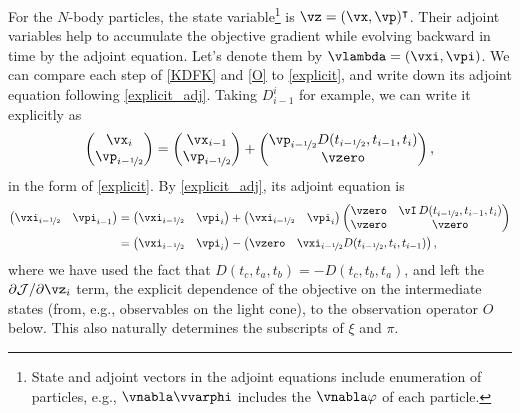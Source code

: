 \documentclass[modern, dvipsnames]{aastex631}
\newcommand{\p}{\partial}
\newcommand{\cJ}{\mathcal{J}}
\newcommand{\half}{\nicefrac12}
\begin{document}
For the $N$-body particles, the state variable\footnote{State and
adjoint vectors in the adjoint equations include enumeration of
particles, e.g., $\vnabla\vvarphi$ includes the $\vnabla\varphi$ of each
particle.} is $\vz = (\vx, \vp)^\intercal$.
Their adjoint variables help to accumulate the objective gradient while
evolving backward in time by the adjoint equation.
Let's denote them by $\vlambda = (\vxi, \vpi)$.
We can compare each step of \eqref{KDFK} and \eqref{O} to
\eqref{explicit}, and write down its adjoint equation following
\eqref{explicit_adj}.
Taking $D_{i-1}^i$ for example, we can write it explicitly as
%
\begin{equation*}
\begin{pmatrix} \vx_i \\ \vp_{i-\half} \end{pmatrix}
= \begin{pmatrix} \vx_{i-1} \\ \vp_{i-\half} \end{pmatrix}
+ \begin{pmatrix}
    \vp_{i-\half} D(t_{i-\half}, t_{i-1}, t_i) \\ \vzero
  \end{pmatrix},
\end{equation*}
%
in the form of \eqref{explicit}.
By \eqref{explicit_adj}, its adjoint equation is
%
\begin{align*}
\begin{pmatrix} \vxi_{i-\half} & \vpi_{i-1} \end{pmatrix}
&= \begin{pmatrix} \vxi_{i-\half} & \vpi_i \end{pmatrix}
+ \begin{pmatrix} \vxi_{i-\half} & \vpi_i \end{pmatrix}
  \begin{pmatrix}
    \vzero & \vI \, D(t_{i-\half}, t_{i-1}, t_i) \\
    \vzero & \vzero \\
  \end{pmatrix} \\
%
&= \begin{pmatrix} \vxi_{i-\half} & \vpi_i \end{pmatrix}
- \begin{pmatrix}
    \vzero & \vxi_{i-\half} D(t_{i-\half}, t_i, t_{i-1})
  \end{pmatrix},
\end{align*}
%
where we have used the fact that $D(t_c, t_a, t_b) = - D(t_c, t_b,
t_a)$, and left the $\p\cJ / \p\vz_i$ term, the explicit dependence of
the objective on the intermediate states (from, e.g., observables on the
light cone), to the observation operator $O$ below.
This also naturally determines the subscripts of $\xi$ and $\pi$.
\end{document}
